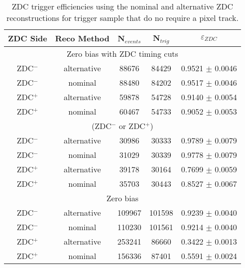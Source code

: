       \begin{table}
        \centering
        \begin{tabular}{|c|c|c|c|c|}
          \hline ZDC Side & Reco Method & N$_{events}$ & N$_{trig}$ & $\varepsilon_{ZDC}$ \\ \hline
          \multicolumn{5}{|c|}{ Zero bias with ZDC timing cuts} \\ \hline 
           ZDC$^{-}$ & alternative & 88676  & 84429  & 0.9521 $\pm$ 0.0046 \\ \hline
           ZDC$^{-}$ & nominal & 88480  & 84202  & 0.9517 $\pm$ 0.0046 \\ \hline
           ZDC$^{+}$ & alternative & 59878  & 54728  & 0.9140  $\pm$ 0.0054 \\ \hline
           ZDC$^{+}$ & nominal & 60467  & 54733  & 0.9052  $\pm$ 0.0053 \\ \hline
           \multicolumn{5}{|c|}{(ZDC$^{-}$ or ZDC$^{+}$)} \\ \hline 
           ZDC$^{-}$ & alternative & 30986 & 30333 & 0.9789 $\pm$ 0.0079 \\ \hline
           ZDC$^{-}$ & nominal & 31029 & 30339 & 0.9778 $\pm$ 0.0079 \\ \hline
           ZDC$^{+}$ & alternative & 39178 & 30164 & 0.7699 $\pm$ 0.0059 \\ \hline
           ZDC$^{+}$ & nominal & 35703 & 30443 & 0.8527 $\pm$ 0.0067 \\ \hline
           \multicolumn{5}{|c|}{ Zero bias} \\ \hline 
           ZDC$^{-}$ & alternative & 109967  & 101598  & 0.9239 $\pm$ 0.0040 \\ \hline
           ZDC$^{-}$ & nominal & 110230  & 101561  & 0.9214 $\pm$ 0.0040 \\ \hline
           ZDC$^{+}$ & alternative & 253241  & 86660  & 0.3422 $\pm$ 0.0013 \\ \hline
           ZDC$^{+}$ & nominal & 156336  & 87401  & 0.5591 $\pm$ 0.0024 \\ \hline
         \end{tabular}
        \caption{ZDC trigger efficiencies using  the nominal and alternative 
        ZDC reconstructions for trigger sample that do no require a pixel track.}
        \label{tab:zdcEfficiencySysNoiseSample}
      \end{table}
